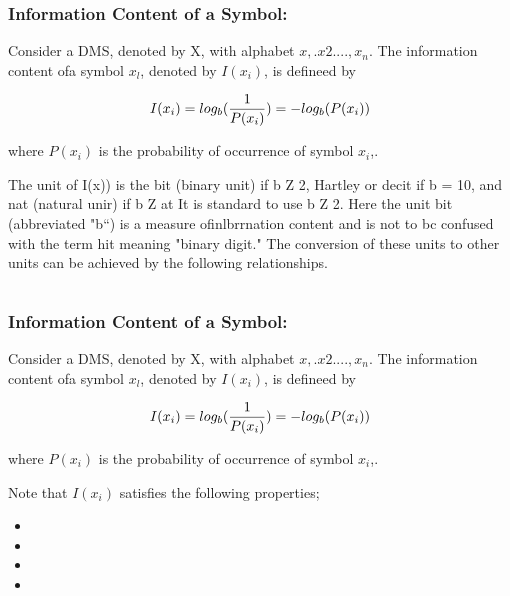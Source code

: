 \documentclass[a4]{beamer}
\begin{document}
\begin{frame}
\frametitle{ Information Content of a Symbol:}

Consider a DMS, denoted by X, with alphabet ${x,.x2. ...,x_n}$. The information content ofa symbol
$x_l$, denoted by $I(x_i)$, is defineed by

\[  I(x_i)  = log_b({1 \over P(x_i)}) =  -log_b( P(x_i) ) \]


where $P(x_i)$ is the probability of occurrence of symbol $x_i$,.
\end{frame}

\begin{frame}
The unit of I(x)) is the bit (binary unit) if b Z 2, Hartley or decit if b = 10, and nat (natural unir) if
b Z at It is standard to use b Z 2. Here the unit bit (abbreviated "b“) is a measure ofinlbrrnation
content and is not to bc confused with the term hit meaning "binary digit." The conversion of these
units to other units can be achieved by the following relationships.

\[   \]
\end{frame}
\begin{frame}
\frametitle{ Information Content of a Symbol:}

Consider a DMS, denoted by X, with alphabet ${x,.x2. ...,x_n}$. The information content ofa symbol
$x_l$, denoted by $I(x_i)$, is defineed by

\[  I(x_i)  = log_b({1 \over P(x_i)}) =  -log_b( P(x_i) ) \]


where $P(x_i)$ is the probability of occurrence of symbol $x_i$,.
\end{frame}


\begin{frame}
Note that $I(x_i)$ satisfies the following properties;
\begin{itemize}
\item %
\item %
\item %
\item %
\end{itemize}
\end{frame}
\end{document}
